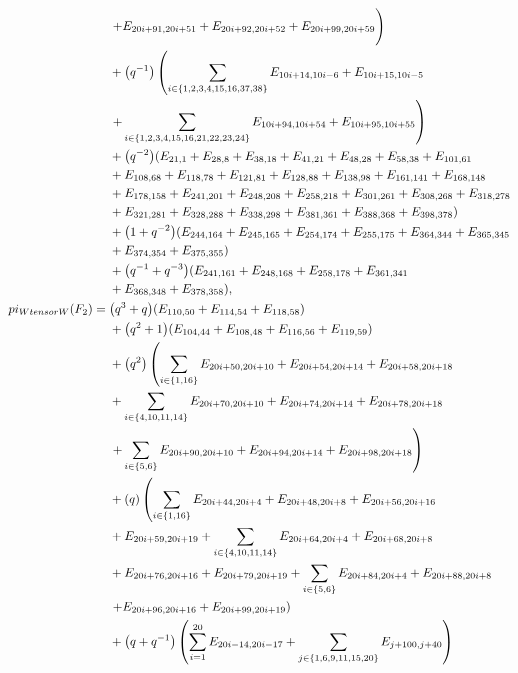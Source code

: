 \documentclass[10pt,a4paper]{amsart}
\numberwithin{equation}{section}
\theoremstyle{definition}
\def\pi{pi}
\def\otimes{ tensor }
\begin{document}
\begin{align*}
&\left. + E_{20i+91,20i+51}+ E_{20i+92,20i+52} + E_{20i+99,20i+59} \vphantom{\sum_{i=1}^{20}}\right) \\
&+\bigl(q^{-1}\bigr)\left(\sum_{i \in \{1,2,3,4,15,16,37,38\}} E_{10i+14,10i-6} + E_{10i+15,10i-5} \right. \\
&\left. + \sum_{i \in \{1,2,3,4,15,16,21,22,23,24\}} E_{10i+94,10i+54} + E_{10i+95,10i+55} \right) \\
&
+\bigl(q^{-2}\bigr)(E_{21,1}+E_{28,8}+E_{38,18}+E_{41,21}+E_{48,28}+E_{58,38}+E_{101,61}\\
&+E_{108,68}+E_{118,78}+E_{121,81}+E_{128,88}+E_{138,98}+E_{161,141}+E_{168,148}\\
&+E_{178,158}+E_{241,201}+E_{248,208}+E_{258,218}+E_{301,261}+E_{308,268}+E_{318,278}\\
&+E_{321,281}+E_{328,288}+E_{338,298}+E_{381,361}+E_{388,368}+E_{398,378})\\
&+\bigl(1 + q^{-2}\bigr)(E_{244,164}+E_{245,165}+E_{254,174}+E_{255,175}+E_{364,344}+E_{365,345}\\
&+E_{374,354}+E_{375,355})\\
&+\bigl(q^{-1} + q^{-3}\bigr)(E_{241,161}+E_{248,168}+E_{258,178}+E_{361,341}\\
&+E_{368,348}+E_{378,358}),
\\
 \pi_{W \otimes W}(F_2) ={}
&\bigl(q^3 + q\bigr)(E_{110,50}+E_{114,54}+E_{118,58})\\
&+\bigl(q^2 + 1\bigr)(E_{104,44}+E_{108,48}+E_{116,56}+E_{119,59})\\
&+\bigl(q^2\bigr)\left(\sum_{i \in \{1,16\}} E_{20i+50,20i+10} + E_{20i+54,20i+14} + E_{20i+58,20i+18} \right.\\
&+\sum_{i \in \{4,10,11,14\}} E_{20i+70,20i+10} + E_{20i+74,20i+14} + E_{20i+78,20i+18} \\
&\left.+\sum_{i \in \{5,6\}} E_{20i+90,20i+10} + E_{20i+94,20i+14} + E_{20i+98,20i+18} \right) \\
&+(q)\left(\sum_{i \in \{1,16\}} E_{20i+44,20i+4} + E_{20i+48,20i+8} + E_{20i+56,20i+16} \right.\\
&+ E_{20i+59,20i+19}+\sum_{i \in \{4,10,11,14\}} E_{20i+64,20i+4} + E_{20i+68,20i+8} \\
&+ E_{20i+76,20i+16} + E_{20i+79,20i+19}+ \sum_{i \in \{5,6\}} E_{20i+84,20i+4} + E_{20i+88,20i+8} \\
&\left. + E_{20i+96,20i+16}+ E_{20i+99,20i+19} \right)
\\
&
+\bigl(q+q^{-1}\bigr) \left( \sum_{i=1}^{20} E_{20i-14,20i-17} \vphantom{\sum_{j \in \{1,6,9,11,15,20\}}} + \sum_{j \in \{1,6,9,11,15,20\}} E_{j+100,j+40} \right)\\

\end{align*}
\end{document}
